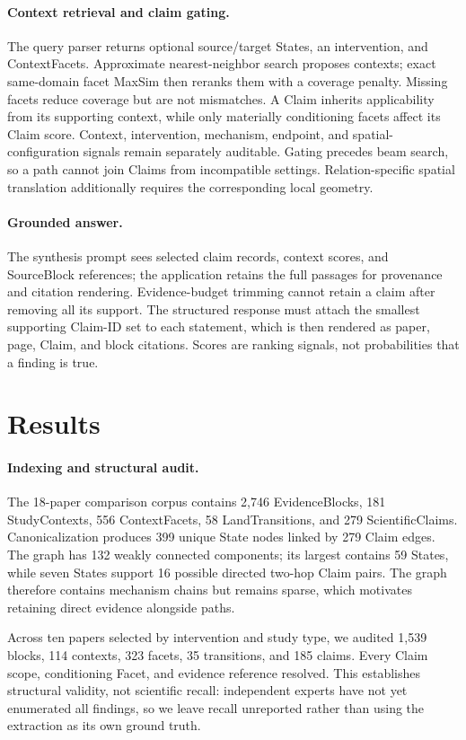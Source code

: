 \documentclass{article}
\begin{document}
\paragraph{Context retrieval and claim gating.}
The query parser returns optional source/target States, an intervention, and ContextFacets. Approximate nearest-neighbor search proposes contexts; exact same-domain facet MaxSim then reranks them with a coverage penalty. Missing facets reduce coverage but are not mismatches. A Claim inherits applicability from its supporting context, while only materially conditioning facets affect its Claim score. Context, intervention, mechanism, endpoint, and spatial-configuration signals remain separately auditable. Gating precedes beam search, so a path cannot join Claims from incompatible settings. Relation-specific spatial translation additionally requires the corresponding local geometry.

\paragraph{Grounded answer.}
The synthesis prompt sees selected claim records, context scores, and SourceBlock references; the application retains the full passages for provenance and citation rendering. Evidence-budget trimming cannot retain a claim after removing all its support. The structured response must attach the smallest supporting Claim-ID set to each statement, which is then rendered as paper, page, Claim, and block citations. Scores are ranking signals, not probabilities that a finding is true.

\section{Results}
\paragraph{Indexing and structural audit.}
The 18-paper comparison corpus contains 2,746 EvidenceBlocks, 181 StudyContexts, 556 ContextFacets, 58 LandTransitions, and 279 ScientificClaims. Canonicalization produces 399 unique State nodes linked by 279 Claim edges. The graph has 132 weakly connected components; its largest contains 59 States, while seven States support 16 possible directed two-hop Claim pairs. The graph therefore contains mechanism chains but remains sparse, which motivates retaining direct evidence alongside paths.

Across ten papers selected by intervention and study type, we audited 1,539 blocks, 114 contexts, 323 facets, 35 transitions, and 185 claims. Every Claim scope, conditioning Facet, and evidence reference resolved. This establishes structural validity, not scientific recall: independent experts have not yet enumerated all findings, so we leave recall unreported rather than using the extraction as its own ground truth.
\end{document}
